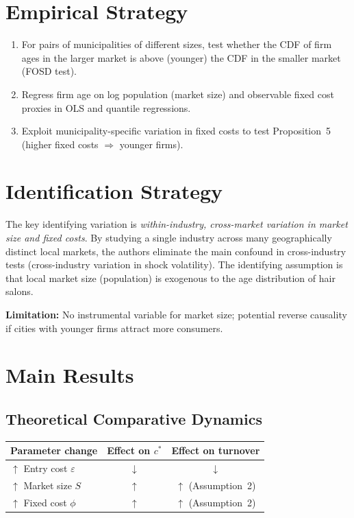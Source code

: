 \section{Empirical Strategy}

\begin{enumerate}
  \item For pairs of municipalities of different sizes, test whether the CDF
    of firm ages in the larger market is above (younger) the CDF in the
    smaller market (FOSD test).
  \item Regress firm age on log population (market size) and observable fixed
    cost proxies in OLS and quantile regressions.
  \item Exploit municipality-specific variation in fixed costs to test
    Proposition~5 (higher fixed costs $\Rightarrow$ younger firms).
\end{enumerate}

\section{Identification Strategy}

The key identifying variation is \emph{within-industry, cross-market variation
in market size and fixed costs}. By studying a single industry across many
geographically distinct local markets, the authors eliminate the main confound
in cross-industry tests (cross-industry variation in shock volatility). The
identifying assumption is that local market size (population) is exogenous to
the age distribution of hair salons.

\textbf{Limitation:} No instrumental variable for market size; potential
reverse causality if cities with younger firms attract more consumers.

\section{Main Results}

\subsection*{Theoretical Comparative Dynamics}

\begin{center}
\begin{tabular}{lcc}
\toprule
\textbf{Parameter change} & \textbf{Effect on $c^*$} &
  \textbf{Effect on turnover} \\
\midrule
$\uparrow$ Entry cost $\varepsilon$ & $\downarrow$ & $\downarrow$ \\
$\uparrow$ Market size $S$ & $\uparrow$ & $\uparrow$ \quad (Assumption~2) \\
$\uparrow$ Fixed cost $\phi$ & $\uparrow$ & $\uparrow$ \quad (Assumption~2) \\
\bottomrule
\end{tabular}
\end{center}

